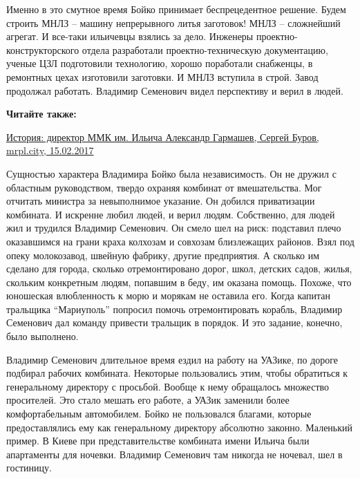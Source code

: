 Именно в это смутное время Бойко принимает беспрецедентное решение. Будем
строить МНЛЗ – машину непрерывного литья заготовок! МНЛЗ – сложнейший агрегат.
И все-таки ильичевцы взялись за дело. Инженеры проектно-конструкторского отдела
разработали проектно-техническую документацию, ученые ЦЗЛ подготовили
технологию, хорошо поработали снабженцы, в ремонтных цехах изготовили
заготовки. И МНЛЗ вступила в строй. Завод продолжал работать. Владимир
Семенович видел перспективу и верил в людей.

\textbf{Читайте также:} 

\href{https://archive.org/details/15_02_2017.sergij_burov.mrpl_city.istoria_direktor_mmk_im_iljicha_aleksandr_garmashev}{%
История: директор ММК им. Ильича Александр Гармашев, Сергей Буров, mrpl.city, 15.02.2017}

Сущностью характера Владимира Бойко была независимость. Он не дружил с
областным руководством, твердо охраняя комбинат от вмешательства. Мог отчитать
министра за невыполнимое указание. Он добился приватизации комбината. И
искренне любил людей, и верил людям. Собственно, для людей жил и трудился
Владимир Семенович. Он смело шел на риск: подставил плечо оказавшимся на грани
краха колхозам  и совхозам близлежащих районов. Взял под опеку молокозавод,
швейную фабрику, другие предприятия. А сколько им сделано для города, сколько
отремонтировано дорог, школ, детских садов, жилья, скольким конкретным людям,
попавшим в беду, им оказана помощь. Похоже, что юношеская влюбленность к морю и
морякам не оставила его. Когда капитан тральщика \enquote{Мариуполь} попросил помочь
отремонтировать корабль, Владимир Семенович дал команду привести тральщик в
порядок. И это задание, конечно, было выполнено.

Владимир Семенович длительное время ездил на работу на УАЗике, по дороге
подбирал рабочих комбината. Некоторые пользовались этим, чтобы обратиться к
генеральному директору с просьбой. Вообще к нему обращалось множество
просителей. Это стало мешать его работе, а УАЗик заменили более комфортабельным
автомобилем. Бойко не пользовался благами, которые предоставлялись ему как
генеральному директору абсолютно законно. Маленький пример. В Киеве при
представительстве комбината имени Ильича были апартаменты для ночевки. Владимир
Семенович там никогда не ночевал, шел в гостиницу.

